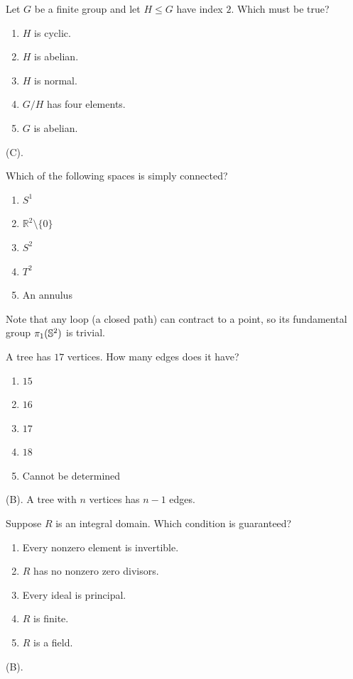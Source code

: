 \begin{exercise}
Let $G$ be a finite group and let $H\leq G$ have index $2$. Which must be true?

\begin{enumerate}[label=(\Alph*)]
    \item $H$ is cyclic.
    \item $H$ is abelian.
    \item $H$ is normal.
    \item $G/H$ has four elements.
    \item $G$ is abelian.
\end{enumerate}
\end{exercise}
\begin{solution}
(C).
\end{solution}

\begin{exercise}
Which of the following spaces is simply connected?
\begin{enumerate}[label=(\Alph*)]
    \item $S^1$
    \item $\mathbb{R}^2\setminus\{0\}$
    \item $S^2$
    \item $T^2$
    \item An annulus
\end{enumerate}
\end{exercise}
\begin{solution}
Note that any loop (a closed path) can contract to a point, 
so its fundamental group $\pi_1(\S^2)$ is trivial.
\end{solution}

\begin{exercise}
A tree has $17$ vertices. How many edges does it have?
\begin{enumerate}[label=(\Alph*)]
    \item $15$
    \item $16$
    \item $17$
    \item $18$
    \item Cannot be determined
\end{enumerate}
\end{exercise}
\begin{solution}
(B). A tree with $n$ vertices has $n-1$ edges.
\end{solution}

\begin{exercise}
Suppose $R$ is an integral domain. Which condition is guaranteed?
\begin{enumerate}[label=(\Alph*)]
    \item Every nonzero element is invertible.
    \item $R$ has no nonzero zero divisors.
    \item Every ideal is principal.
    \item $R$ is finite.
    \item $R$ is a field.
\end{enumerate}
\end{exercise}
\begin{solution}
(B).
\end{solution}

